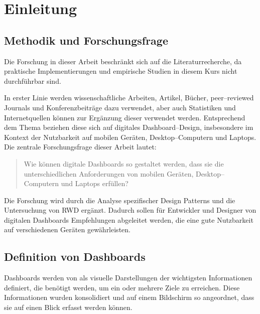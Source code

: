 \section{Einleitung}\label{sec:einleitung}


\subsection{Methodik und Forschungsfrage}\label{subsec:methodik-forschungsfrage}

Die Forschung in dieser Arbeit beschränkt sich auf die Literaturrecherche, da praktische Implementierungen und empirische Studien in diesem Kurs nicht durchführbar sind.

In erster Linie werden wissenschaftliche Arbeiten, Artikel, Bücher, peer--reviewed Journals und Konferenzbeiträge dazu verwendet, aber auch Statistiken und Internetquellen können zur Ergänzung dieser verwendet werden.
Entsprechend dem Thema beziehen diese sich auf digitales Dashboard--Design, insbesondere im Kontext der Nutzbarkeit auf mobilen Geräten, Desktop--Computern und Laptops.
Die zentrale Forschungsfrage dieser Arbeit lautet:

\begin{quote}
    Wie können digitale Dashboards so gestaltet werden, dass sie die unterschiedlichen Anforderungen von mobilen Geräten, Desktop--Computern und Laptops erfüllen?
\end{quote}

Die Forschung wird durch die Analyse spezifischer Design Patterns und die Untersuchung von \acl{RWD} ergänzt.
Dadurch sollen für Entwickler und Designer von digitalen Dashboards Empfehlungen abgeleitet werden, die eine gute Nutzbarkeit auf verschiedenen Geräten gewährleisten.

\subsection{Definition von Dashboards}\label{subsec:dashboard-definition-limits}

Dashboards werden von \autocite{Few.InformationDashboardDesign.2013} als visuelle Darstellungen der wichtigsten Informationen definiert, die benötigt werden, um ein oder mehrere Ziele zu erreichen.
Diese Informationen wurden konsolidiert und auf einem Bildschirm so angeordnet, dass sie auf einen Blick erfasst werden können.

